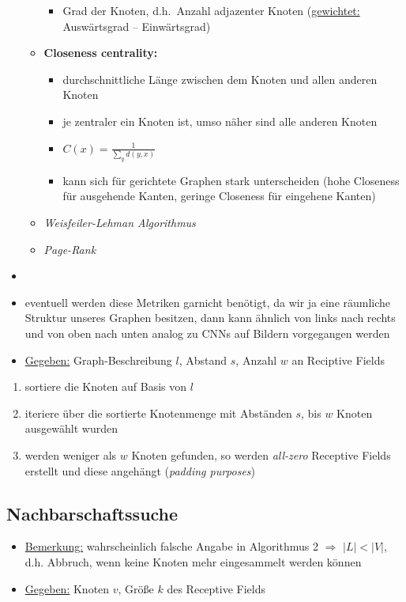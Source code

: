 \begin{itemize}
\begin{itemize}
\begin{itemize}
      \item Grad der Knoten, d.h.\ Anzahl adjazenter Knoten (\underline{gewichtet:} Auswärtsgrad – Einwärtsgrad)
    \end{itemize}
    \item \textbf{Closeness centrality:}
    \begin{itemize}
      \item durchschnittliche Länge zwischen dem Knoten und allen anderen Knoten
      \item je zentraler ein Knoten ist, umso näher sind alle anderen Knoten
      \item $C(x) = \frac{1}{\sum_y d(y,x)}$
      \item kann sich für gerichtete Graphen stark unterscheiden (hohe Closeness für ausgehende Kanten, geringe Closeness für eingehene Kanten)
    \end{itemize}
    \item \emph{Weisfeiler-Lehman Algorithmus}
    \item \emph{Page-Rank}
  \end{itemize}
  \item {}
  \item eventuell werden diese Metriken garnicht benötigt, da wir ja eine räumliche Struktur unseres Graphen besitzen, dann kann ähnlich von links nach rechts und von oben nach unten analog zu CNNs auf Bildern vorgegangen werden
  \item \underline{Gegeben:} Graph-Beschreibung $l$, Abstand $s$, Anzahl $w$ an Reciptive Fields
\end{itemize}

\begin{enumerate}
  \item sortiere die Knoten auf Basis von $l$
  \item iteriere über die sortierte Knotenmenge mit Abständen $s$, bis $w$ Knoten ausgewählt wurden
  \item werden weniger als $w$ Knoten gefunden, so werden \emph{all-zero} Receptive Fields erstellt und diese angehängt (\emph{padding purposes})
\end{enumerate}

\subsection{Nachbarschaftssuche}

\begin{itemize}
  \item \underline{Bemerkung:} wahrscheinlich falsche Angabe in Algorithmus 2 $\Rightarrow$ $|L| < |V|$, d.h. Abbruch, wenn keine Knoten mehr eingesammelt werden können
  \item \underline{Gegeben:} Knoten $v$, Größe $k$ des Receptive Fields
\end{itemize}

